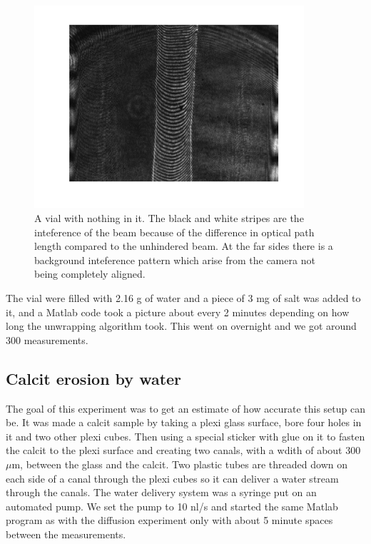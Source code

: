 \begin {figure}[ht!]
\includegraphics [width=10cm]{bilder/sample.png}
\caption {A vial with nothing in it. The black and white stripes are the inteference %
          of the beam because of the difference in optical path length compared to the %
          unhindered beam. At the far sides there is a background inteference pattern %
          which arise from the camera not being completely aligned.}
\end {figure}

The vial were filled with 2.16 g of water and a piece of 3 mg of salt was added to it,
and a Matlab code took a picture about every 2 minutes depending on how long the 
unwrapping algorithm took. This went on overnight and we got around 300 measurements.

\subsection {Calcit erosion by water}

The goal of this experiment was to get an estimate of how accurate this setup can
be. It was made a calcit sample by taking a plexi glass surface, bore four holes
in it and two other plexi cubes. Then using a special sticker with glue on it to
fasten the calcit to the plexi surface and creating two canals, with a wdith of about
300 $\mu$m, between the glass and the calcit. Two plastic tubes are threaded down 
on each side of a canal through the plexi cubes so it can deliver a water stream 
through the canals. The water delivery system was a syringe put on an automated pump. 
We set the pump to 10 nl/s and started the same Matlab program as with the diffusion
experiment only with about 5 minute spaces between the measurements.




